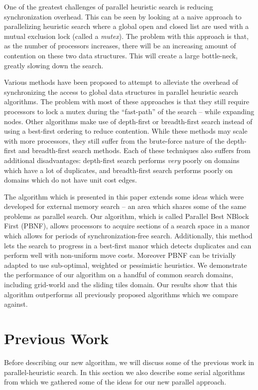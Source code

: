 \documentclass{article}
\begin{document}
One of the greatest challenges of parallel heuristic search is
reducing synchronization overhead.  This can be seen by looking at a
naive approach to parallelizing heuristic search where a global open
and closed list are used with a mutual exclusion lock (called a
\emph{mutex}).  The problem with this approach is that, as the number
of processors increases, there will be an increasing amount of
contention on these two data structures.  This will create a large
bottle-neck, greatly slowing down the search.

Various methods have been proposed to attempt to alleviate the
overhead of synchronizing the access to global data structures in
parallel heuristic search algorithms.  The problem with most of these
approaches is that they still require processors to lock a mutex
during the ``fast-path'' of the search -- while expanding nodes.
Other algorithms make use of depth-first or breadth-first search
instead of using a best-first ordering to reduce contention.  While
these methods may scale with more processors, they still suffer from
the brute-force nature of the depth-first and breadth-first search
methods.  Each of these techniques also suffers from additional
disadvantages: depth-first search performs \emph{very} poorly on
domains which have a lot of duplicates, and breadth-first search
performs poorly on domains which do not have unit cost edges.

The algorithm which is presented in this paper extends some ideas
which were developed for external memory search -- an area which
shares some of the same problems as parallel search.  Our algorithm,
which is called Parallel Best NBlock First (PBNF), allows processors
to acquire sections of a search space in a manor which allows for
periods of synchronization-free search.  Additionally, this method
lets the search to progress in a best-first manor which detects
duplicates and can perform well with non-uniform move costs.  Moreover
PBNF can be trivially adapted to use sub-optimal, weighted or
pessimistic heuristics.  We demonstrate the performance of our
algorithm on a handful of common search domains, including grid-world
and the sliding tiles domain.  Our results show that this algorithm
outperforms all previously proposed algorithms which we compare
against.

\section{Previous Work}

Before describing our new algorithm, we will discuss some of the
previous work in parallel-heuristic search.  In this section we also
describe some serial algorithms from which we gathered some of the
ideas for our new parallel approach.
\end{document}
